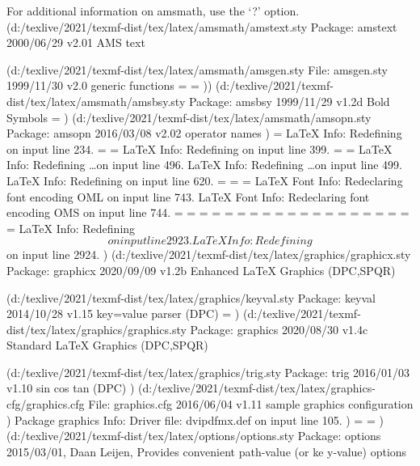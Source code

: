 For additional information on amsmath, use the `?' option.
(d:/texlive/2021/texmf-dist/tex/latex/amsmath/amstext.sty
Package: amstext 2000/06/29 v2.01 AMS text

(d:/texlive/2021/texmf-dist/tex/latex/amsmath/amsgen.sty
File: amsgen.sty 1999/11/30 v2.0 generic functions
\@emptytoks=
\ex@=
))
(d:/texlive/2021/texmf-dist/tex/latex/amsmath/amsbsy.sty
Package: amsbsy 1999/11/29 v1.2d Bold Symbols
\pmbraise@=
)
(d:/texlive/2021/texmf-dist/tex/latex/amsmath/amsopn.sty
Package: amsopn 2016/03/08 v2.02 operator names
)
\inf@bad=
LaTeX Info: Redefining \frac on input line 234.
\uproot@=
\leftroot@=
LaTeX Info: Redefining \overline on input line 399.
\classnum@=
\DOTSCASE@=
LaTeX Info: Redefining \ldots on input line 496.
LaTeX Info: Redefining \dots on input line 499.
LaTeX Info: Redefining \cdots on input line 620.
\Mathstrutbox@=
\strutbox@=
\big@size=
LaTeX Font Info:    Redeclaring font encoding OML on input line 743.
LaTeX Font Info:    Redeclaring font encoding OMS on input line 744.
\macc@depth=
\c@MaxMatrixCols=
\dotsspace@=
\c@parentequation=
\dspbrk@lvl=
\tag@help=
\row@=
\column@=
\maxfields@=
\andhelp@=
\eqnshift@=
\alignsep@=
\tagshift@=
\tagwidth@=
\totwidth@=
\lineht@=
\@envbody=
\multlinegap=
\multlinetaggap=
\mathdisplay@stack=
LaTeX Info: Redefining \[ on input line 2923.
LaTeX Info: Redefining \] on input line 2924.
)
(d:/texlive/2021/texmf-dist/tex/latex/graphics/graphicx.sty
Package: graphicx 2020/09/09 v1.2b Enhanced LaTeX Graphics (DPC,SPQR)

(d:/texlive/2021/texmf-dist/tex/latex/graphics/keyval.sty
Package: keyval 2014/10/28 v1.15 key=value parser (DPC)
\KV@toks@=
)
(d:/texlive/2021/texmf-dist/tex/latex/graphics/graphics.sty
Package: graphics 2020/08/30 v1.4c Standard LaTeX Graphics (DPC,SPQR)

(d:/texlive/2021/texmf-dist/tex/latex/graphics/trig.sty
Package: trig 2016/01/03 v1.10 sin cos tan (DPC)
)
(d:/texlive/2021/texmf-dist/tex/latex/graphics-cfg/graphics.cfg
File: graphics.cfg 2016/06/04 v1.11 sample graphics configuration
)
Package graphics Info: Driver file: dvipdfmx.def on input line 105.
)
\Gin@req@height=
\Gin@req@width=
)
(d:/texlive/2021/texmf-dist/tex/latex/options/options.sty
Package: options 2015/03/01, Daan Leijen, Provides convenient path-value (or ke
y-value) options

